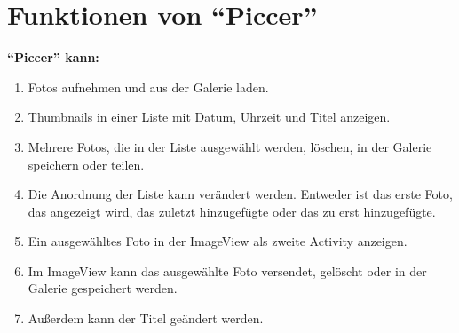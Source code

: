 \section{Funktionen von \enquote{Piccer}}
\textbf{\enquote{Piccer} kann:}
\begin{enumerate}
\item Fotos aufnehmen und aus der Galerie laden.
\item Thumbnails in einer Liste mit Datum, Uhrzeit und Titel anzeigen. 
\item Mehrere Fotos, die in der Liste ausgewählt werden, löschen, in der Galerie speichern oder teilen.
\item Die Anordnung der Liste kann verändert werden. Entweder ist das erste Foto, das angezeigt wird, das zuletzt hinzugefügte oder das zu erst hinzugefügte.
\item Ein ausgewähltes Foto in der ImageView als zweite Activity anzeigen.
\item Im ImageView kann das ausgewählte Foto versendet, gelöscht oder in der Galerie gespeichert werden.
\item Außerdem kann der Titel geändert werden.

\end{enumerate}


